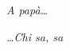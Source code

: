 
\vspace{30cm}


\begin{flushright}
    \emph{A papà\dots}

    \emph{\dots Chi sa, sa}
\end{flushright}